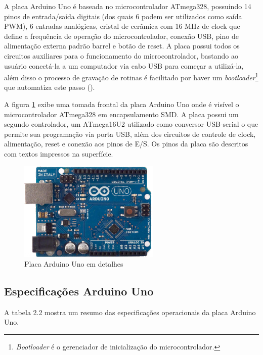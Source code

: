 A placa Arduino Uno é baseada no microcontrolador ATmega328, possuindo 14 pinos de entrada/saída digitais (dos quais 6 podem ser utilizados como saída PWM), 6 entradas analógicas, cristal de cerâmica com 16 MHz de clock que define a frequência de operação do microcontrolador, conexão USB, pino de alimentação externa padrão barrel e botão de reset. A placa possui todos os circuitos auxiliares para o funcionamento do microcontrolador, bastando ao usuário conectá-la a um computador via cabo USB para começar a utilizá-la, além disso o processo de gravação de rotinas é facilitado por haver um \textit{bootloader}\footnote{\textit{Bootloader} é o gerenciador de inicialização do microcontrolador.} que automatiza este passo (\textcite{arduino_specs:2013}).

A figura \ref{fig:arduinouno} exibe uma tomada frontal da placa Arduino Uno onde é visível o microcontrolador ATmega328 em encapsulamento SMD. A placa possui um segundo controlador, um ATmega16U2 utilizado como conversor USB-serial o que permite sua programação via porta USB, além dos circuitos de controle de clock, alimentação, reset e conexão aos pinos de E/S. Os pinos da placa são descritos com textos impressos na superfície.

\begin{figure}[h!]
			\centering
			\includegraphics[width=0.6\textwidth]{figures/arduinoUnoFront.jpg}
			\caption{Placa Arduino Uno em detalhes}
			\label{fig:arduinouno}
\end{figure}


\subsection{Especificações Arduino Uno}

A tabela 2.2 mostra um resumo das especificações operacionais da placa Arduino Uno.

